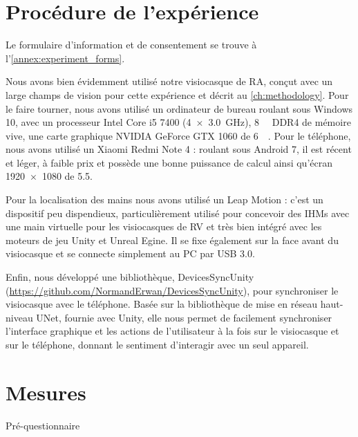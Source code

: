 \section{Procédure de l'expérience}
\label{sec:experiment_procedure}

Le formulaire d'information et de consentement se trouve à l'\autoref{annex:experiment_forms}.

Nous avons bien évidemment utilisé notre visiocasque de RA, conçut avec un large champs de vision pour cette expérience et décrit au \autoref{ch:methodology}. Pour le faire tourner, nous avons utilisé un ordinateur de bureau roulant sous Windows 10, avec un processeur Intel Core i5 7400 (\SI[product-units = single]{4x3.0}{\GHz}), \SI{8}{\giga\byte} DDR4 de mémoire vive, une carte graphique NVIDIA GeForce GTX 1060 de \SI{6}{\giga\byte}. Pour le téléphone, nous avons utilisé un Xiaomi Redmi Note 4 : roulant sous Android 7, il est récent et léger, à faible prix et possède une bonne puissance de calcul ainsi qu'écran \SI{1920x1080}{\px} de \SI{5.5}{\inch}.

Pour la localisation des mains nous avons utilisé un Leap Motion : c'est un dispositif peu dispendieux, particulièrement utilisé pour concevoir des IHMs avec une main virtuelle pour les visiocasques de RV et très bien intégré avec les moteurs de jeu Unity et Unreal Egine. Il se fixe également sur la face avant du visiocasque et se connecte simplement au PC par USB 3.0.

Enfin, nous développé une bibliothèque, DevicesSyncUnity (\url{https://github.com/NormandErwan/DevicesSyncUnity}), pour synchroniser le visiocasque avec le téléphone. Basée sur la bibliothèque de mise en réseau haut-niveau UNet, fournie avec Unity, elle nous permet de facilement synchroniser l'interface graphique et les actions de l'utilisateur à la fois sur le visiocasque et sur le téléphone, donnant le sentiment d'interagir avec un seul appareil.


\section{Mesures}
\label{sec:experiment_measures}

Pré-questionnaire

